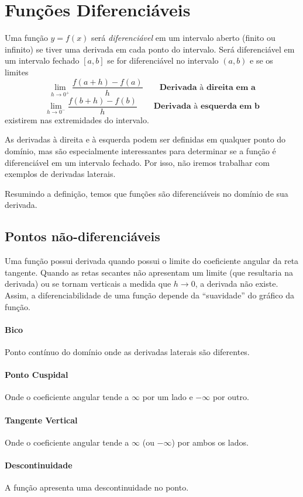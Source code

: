 \section{Funções Diferenciáveis}
\begin{df}
Uma função $y=f(x)$ será \emph{diferenciável} em um intervalo aberto (finito ou infinito) se tiver uma derivada em cada ponto do intervalo. Será diferenciável em um intervalo fechado $[a,b]$ se for diferenciável no intervalo $(a,b)$ e se os limites
\[\lim_{h\rightarrow 0^+}\dfrac{f(a+h)-f(a)}{h} \qquad \textbf{Derivada à direita em a}\]
\[\lim_{h\rightarrow 0^-}\dfrac{f(b+h)-f(b)}{h} \qquad \textbf{Derivada à esquerda em b}\]
existirem nas extremidades do intervalo.
\end{df} \par
As derivadas à direita e à esquerda podem ser definidas em qualquer ponto do domínio, mas são especialmente interessantes para determinar se a função é diferenciável em um intervalo fechado. Por isso, não iremos trabalhar com exemplos de derivadas laterais. \par 
Resumindo a definição, temos que funções são diferenciáveis no domínio de sua derivada.
\subsection{Pontos não-diferenciáveis}
Uma função possui derivada quando possui o limite do coeficiente angular da reta tangente. Quando as retas secantes não apresentam um limite (que resultaria na derivada) ou se tornam verticais a medida que $h \rightarrow 0$, a derivada não existe. Assim, a diferenciabilidade de uma função depende da ``suavidade'' do gráfico da função.
\paragraph{Bico} Ponto contínuo do domínio onde as derivadas laterais são diferentes.
\paragraph{Ponto Cuspidal} Onde o coeficiente angular tende a $\infty$ por um lado e $-\infty$ por outro.
\paragraph{Tangente Vertical} Onde o coeficiente angular tende a $\infty$ (ou $-\infty$) por ambos os lados.
\paragraph{Descontinuidade} A função apresenta uma descontinuidade no ponto.

